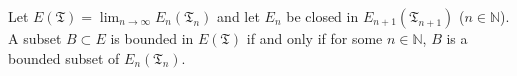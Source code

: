 Let $E(\mathfrak{T}) = \lim_{n \to \infty} E_n(\mathfrak{T}_n)$ and let $E_n$ be closed in $E_{n+1}(\mathfrak{T}_{n+1})$ ($n \in \mathbb{N}$). A subset $B \subset E$ is bounded in $E(\mathfrak{T})$ if and only if for some $n \in \mathbb{N}$, $B$ is a bounded subset of $E_n(\mathfrak{T}_n)$.
